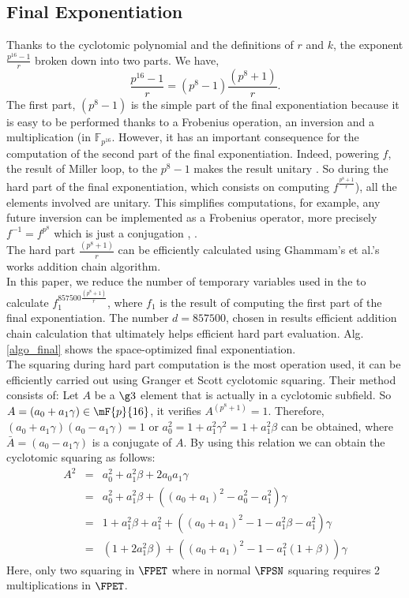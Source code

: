 \subsection{Final Exponentiation}
Thanks to the cyclotomic polynomial and the definitions of $r$ and $k$, the exponent $\frac{p^{16}-1}{r}$  broken down into two parts. We have,
$$\frac{p^{16}-1}{r}=(p^8-1)\frac{(p^8+1)}{r}.$$
The first part, $(p^8-1)$ is the simple part of the final exponentiation
because it is easy to be performed thanks to a Frobenius operation, an inversion and a multiplication (in $\mathbb{F}_{p^{16}}$. 
However, it has an important consequence for the computation of the second part of the final exponentiation. 
Indeed, powering $f$, the result of Miller loop,  to the ${p^8-1}$ makes the result unitary \cite{scott04compressed}. So during the hard part of the final exponentiation, which consists on computing $f^{\frac{p^8+1}{r}}$), all the elements involved are unitary.
This  simplifies computations, for example, any future inversion can be implemented as a Frobenius operator, more precisely $f^{-1}=f^{p^8}$ which is just a conjugation \cite{scott04compressed}, \cite{stam02efficient}. \\
The hard part $\frac{(p^8+1)}{r}$ can be efficiently calculated using Ghammam's et al.'s works \cite{loubna_kss16} addition chain algorithm.\\
In this paper, we  reduce the number of temporary variables used in the  \cite{loubna_kss16} to calculate $f_1^{857500{\frac{(p^8+1)}{r}}}$, where   $f_1 $ is the result of computing the first part of the final exponentiation. 
The  number $d=857500$, chosen in  \cite{loubna_kss16}  results efficient addition chain calculation  that ultimately helps efficient hard part evaluation.
Alg. \ref{algo_final}  shows the space-optimized final exponentiation. \\
The squaring during hard part computation is the most operation used, it can be efficiently carried out using Granger et Scott  \cite{cyclotomic_sqr} cyclotomic squaring. Their method consists of:
Let $A$ be a $\g3$ element that is actually  in a cyclotomic subfield.  So $A = (a_0+a_1\gamma) \in \mF{p}{16}$, it verifies $A^{(p^8+1)}=1$. Therefore,  $(a_0+a_1\gamma) (a_0-a_1\gamma)=1$ or $a_0^2=1+a_1^2\gamma^2 =  1+a_1^2\beta$ can be obtained, where  $\bar{A}=(a_0-a_1\gamma)$ is a conjugate of $A$. 
By using this relation we can obtain the cyclotomic squaring as follows:
\begin{eqnarray}
A^2& = &a_0^2+a_1^2 \beta+2a_0a_1\gamma \nonumber \\
&  = & a_0^2+a_1^2 \beta +((a_0+a_1)^2-a_0^2 -a_1^2)  \gamma\nonumber \\
&=& 1+ a_1^2 \beta + a_1^2 + ((a_0+a_1)^2- 1-a_1^2\beta -a_1^2)\gamma \nonumber \\
&=&  (1+ 2a_1^2 \beta)  + ((a_0+a_1)^2- 1-a_1^2(1+\beta) )\gamma \nonumber 
\end{eqnarray}
Here, only two squaring in $\FPET$ where in normal $\FPSN$ squaring requires 2 multiplications in $\FPET$.

